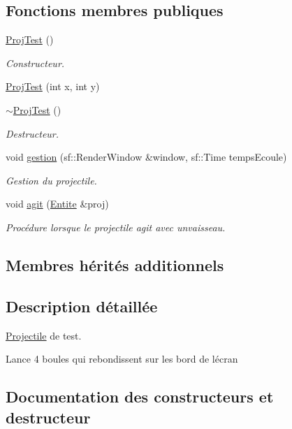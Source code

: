 \subsection*{Fonctions membres publiques}
\begin{DoxyCompactItemize}
\item 
\hyperlink{class_proj_test_a64855e6e7ef8219566ab0fde2b05a9e1}{Proj\+Test} ()
\begin{DoxyCompactList}\small\item\em Constructeur. \end{DoxyCompactList}\item 
\hyperlink{class_proj_test_ae1611498a5b25d561998068205e9f77f}{Proj\+Test} (int x, int y)
\item 
\hyperlink{class_proj_test_a9bc10c512035ae9f3294179c5d2db808}{$\sim$\+Proj\+Test} ()
\begin{DoxyCompactList}\small\item\em Destructeur. \end{DoxyCompactList}\item 
void \hyperlink{class_proj_test_aec696ef399dbe4a7d6cbca6d68196909}{gestion} (sf\+::\+Render\+Window \&window, sf\+::\+Time temps\+Ecoule)
\begin{DoxyCompactList}\small\item\em Gestion du projectile. \end{DoxyCompactList}\item 
void \hyperlink{class_proj_test_a1a20ef0f16a8b58c653a1cf1544ef0b7}{agit} (\hyperlink{class_entite}{Entite} \&proj)
\begin{DoxyCompactList}\small\item\em Procédure lorsque le projectile agit avec unvaisseau. \end{DoxyCompactList}\end{DoxyCompactItemize}
\subsection*{Membres hérités additionnels}


\subsection{Description détaillée}
\hyperlink{class_projectile}{Projectile} de test. 

Lance 4 boules qui rebondissent sur les bord de l\textquotesingle{}écran 

\subsection{Documentation des constructeurs et destructeur}
\mbox{\label{class_proj_test_a64855e6e7ef8219566ab0fde2b05a9e1}} 
